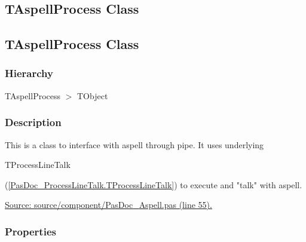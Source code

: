 \documentclass{report}
\begin{document}
\subsection*{\large{\textbf{TAspellProcess Class}}\normalsize\hspace{1ex}\hrulefill}
\else
\subsection*{TAspellProcess Class}
\fi
\label{PasDoc_Aspell.TAspellProcess}
\subsubsection*{\large{\textbf{Hierarchy}}\normalsize\hspace{1ex}\hfill}
TAspellProcess {$>$} TObject
\subsubsection*{\large{\textbf{Description}}\normalsize\hspace{1ex}\hfill}
This is a class to interface with aspell through pipe. It uses underlying \begin{ttfamily}TProcessLineTalk\end{ttfamily}(\ref{PasDoc_ProcessLineTalk.TProcessLineTalk}) to execute and "talk" with aspell.\par
\href{https://github.com/pasdoc/pasdoc/blob/master/source/component/PasDoc_Aspell.pas#L55}{Source: source/component/PasDoc{\_}Aspell.pas (line 55).}\subsubsection*{\large{\textbf{Properties}}\normalsize\hspace{1ex}\hfill}
\end{document}
